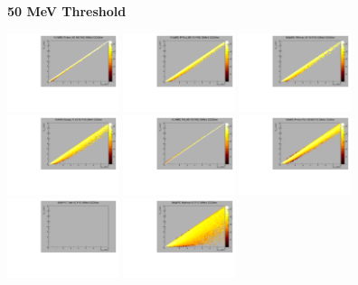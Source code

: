 \textbf{50 MeV Threshold}

\begin{center}

  \includegraphics[width=0.245\textwidth]{plots/response_matrix/Proton_KE_FHC_CCOther_50MeV.pdf}
  \includegraphics[width=0.245\textwidth]{plots/response_matrix/PiPlus_KE_FHC_CCOther_50MeV.pdf}
  \includegraphics[width=0.245\textwidth]{plots/response_matrix/PiMinus_KE_FHC_CCOther_50MeV.pdf}
  \includegraphics[width=0.245\textwidth]{plots/response_matrix/Charged_Pi_KE_FHC_CCOther_50MeV.pdf}
  \includegraphics[width=0.245\textwidth]{plots/response_matrix/Pi0_KE_FHC_CCOther_50MeV.pdf}
  \includegraphics[width=0.245\textwidth]{plots/response_matrix/Proton+Pion_KE_FHC_CCOther_50MeV.pdf}
  \includegraphics[width=0.245\textwidth]{plots/response_matrix/Total_FHC_CCOther_50MeV.pdf}
  \includegraphics[width=0.245\textwidth]{plots/response_matrix/Hadrons_FHC_CCOther_50MeV.pdf}

\end{center}

